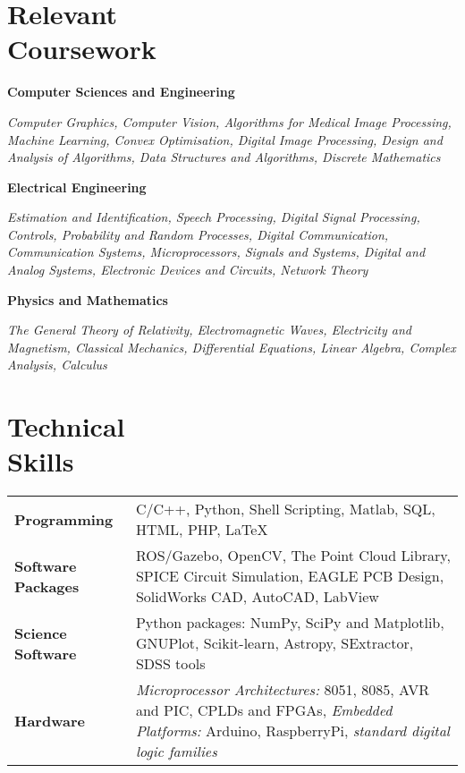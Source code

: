 \documentclass[margin,line]{res}
\newenvironment{list1}{
  \begin{list}{\ding{113}}{%
      \setlength{\itemsep}{0in}
      \setlength{\parsep}{0in} \setlength{\parskip}{0in}
      \setlength{\topsep}{0in} \setlength{\partopsep}{0in} 
      \setlength{\leftmargin}{0.17in}}}{\end{list}}
\begin{document}
\begin{resume}
\section{\sc Relevant \\Coursework} 
\begin{list1}
\item[\strut\hspace{0.5cm}\hypertarget{crselst}{\textbf{Computer Sciences and Engineering}}]
\item[]\textit{Computer Graphics, Computer Vision, Algorithms for Medical Image Processing, Machine Learning, Convex Optimisation, Digital Image Processing, Design and Analysis of Algorithms, Data Structures and Algorithms, Discrete Mathematics}
\item[\strut\hspace{0.5cm}\textbf{Electrical Engineering}]
\vspace{0.05in}
\item[]\textit{Estimation and Identification, Speech Processing, Digital Signal Processing, Controls, Probability and Random Processes, Digital Communication, Communication Systems, Microprocessors, Signals and Systems, Digital and Analog Systems, Electronic Devices and Circuits, Network Theory}
\item[\strut\hspace{0.5cm}\textbf{Physics and Mathematics}]
\vspace{0.05in}
\item[]\textit{The General Theory of Relativity, Electromagnetic Waves, Electricity and Magnetism, Classical Mechanics, Differential Equations, Linear Algebra, Complex Analysis, Calculus}
\end{list1}

\section{\sc Technical \\Skills} 
\begin{tabular}{@{}p{1.3in}p{4.3in}}
\textbf{Programming} & C/C++, Python, Shell Scripting, Matlab, SQL, HTML, PHP, \LaTeX \\  
\vspace*{-0.06in}
\textbf{Software Packages} & 
\vspace*{-0.06in}
ROS/Gazebo, OpenCV, The Point Cloud Library, SPICE Circuit Simulation, EAGLE PCB Design, SolidWorks CAD, AutoCAD, LabView\\ 
\vspace*{-0.06in}
\textbf{Science Software} &
\vspace*{-0.06in}
Python packages: NumPy, SciPy and Matplotlib, GNUPlot, Scikit-learn, Astropy, SExtractor, SDSS tools \\
\vspace*{-0.06in}
\textbf{Hardware} &
\vspace*{-0.06in}
\textit{Microprocessor Architectures:} 8051, 8085, AVR and PIC, CPLDs and FPGAs, \textit{Embedded Platforms:} Arduino, RaspberryPi, \textit{standard digital logic families} \\     
\end{tabular}


\end{resume}
\end{document}

